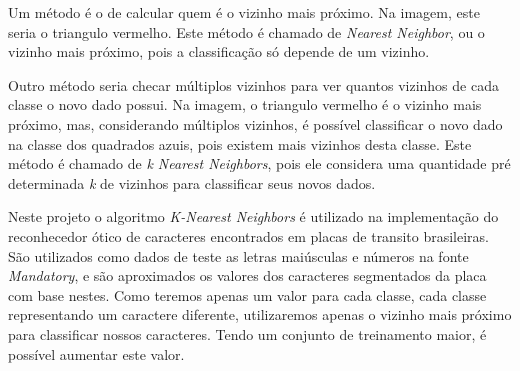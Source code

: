 Um método é o de calcular quem é o vizinho mais próximo. Na imagem, este seria o triangulo vermelho. Este método é chamado de \emph{Nearest Neighbor}, ou o vizinho mais próximo, pois a classificação só depende de um vizinho.

Outro método seria checar múltiplos vizinhos para ver quantos vizinhos de cada classe o novo dado possui. Na imagem, o triangulo vermelho é o vizinho mais próximo, mas, considerando múltiplos vizinhos, é possível classificar o novo dado na classe dos quadrados azuis, pois existem mais vizinhos desta classe. Este método é chamado de \emph{k Nearest Neighbors}, pois ele considera uma quantidade pré determinada \emph{k} de vizinhos para classificar seus novos dados. ~\cite{opencv2014knearest}

Neste projeto o algoritmo \emph{K-Nearest Neighbors} é utilizado na implementação do reconhecedor ótico de caracteres encontrados em placas de transito brasileiras. São utilizados como dados de teste as letras maiúsculas e números na fonte \emph{Mandatory}, e são aproximados os valores dos caracteres segmentados da placa com base nestes. Como teremos apenas um valor para cada classe, cada classe representando um caractere diferente, utilizaremos apenas o vizinho mais próximo para classificar nossos caracteres. Tendo um conjunto de treinamento maior, é possível aumentar este valor.
 